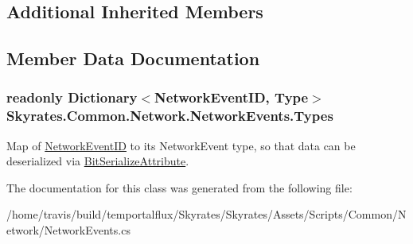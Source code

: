 \subsection*{Additional Inherited Members}


\subsection{Member Data Documentation}
\hypertarget{class_skyrates_1_1_common_1_1_network_1_1_network_events_a9360ac6e13813aa04c2f77c18fea5274}{
\subsubsection[{Types}]{\setlength{\rightskip}{0pt plus 5cm}readonly Dictionary$<${\bf Network\-Event\-I\-D}, Type$>$ Skyrates.\-Common.\-Network.\-Network\-Events.\-Types}}\label{class_skyrates_1_1_common_1_1_network_1_1_network_events_a9360ac6e13813aa04c2f77c18fea5274}


Map of \hyperlink{namespace_skyrates_1_1_common_1_1_network_a90fc6faa44c44b4284114e861d3e761a}{Network\-Event\-I\-D} to its Network\-Event type, so that data can be deserialized via \hyperlink{class_skyrates_1_1_common_1_1_network_1_1_bit_serialize_attribute}{Bit\-Serialize\-Attribute}. 



The documentation for this class was generated from the following file\-:\begin{DoxyCompactItemize}
\item 
/home/travis/build/temportalflux/\-Skyrates/\-Skyrates/\-Assets/\-Scripts/\-Common/\-Network/Network\-Events.\-cs\end{DoxyCompactItemize}

